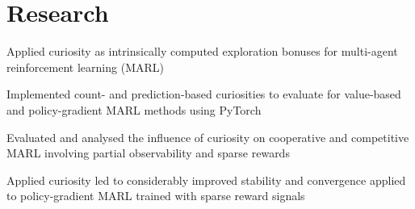 \documentclass[]{deedy-resume}
\begin{document}
\hfill
\begin{minipage}[t]{0.66\textwidth} 



\section{Research}
\vspace{\topsep}
\begin{tightemize}
    \item Applied curiosity as intrinsically computed exploration bonuses for multi-agent reinforcement learning (MARL)
    \item Implemented count- and prediction-based curiosities to evaluate for value-based and policy-gradient MARL methods using PyTorch
    \item Evaluated and analysed the influence of curiosity on cooperative and competitive MARL involving partial observability and sparse rewards
    \item Applied curiosity led to considerably improved stability and convergence applied to policy-gradient MARL trained with sparse reward signals
\end{tightemize}
\sectionsep




\end{minipage}
\end{document}
